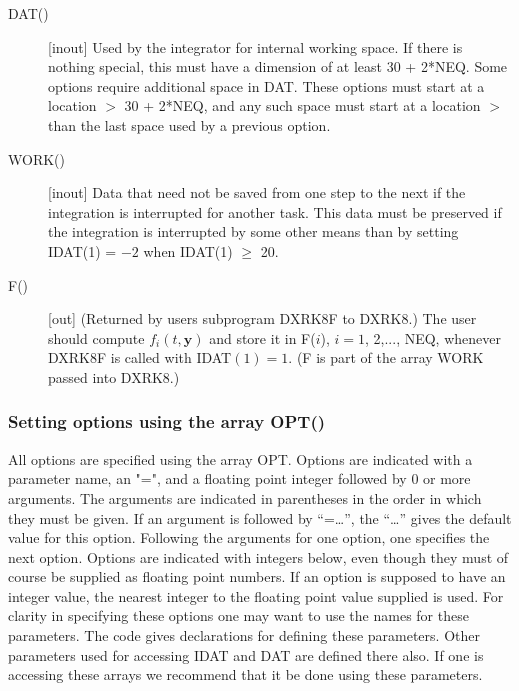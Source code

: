 \documentclass[twoside]{MATH77}
\begin{document}
\begin{description}
\item[DAT()] [inout] Used by the integrator for internal working space.
If there is nothing special, this must have a dimension of at least
30 + 2*NEQ.  Some options require additional space in DAT.  These
options must start at a location $>$ 30 + 2*NEQ, and any such space
must start at a location $>$ than the last space used by a previous
option. 

\item[WORK()] [inout] Data that need not be saved from one step to the
next if the integration is interrupted for another task.  This data must be
preserved if the integration is interrupted by some other means than by
setting IDAT(1) = $-2$ when IDAT(1) $\geq$ 20.

\item[F()]  [out] (Returned by users subprogram DXRK8F to DXRK8.)
The user should compute $f_i(t,{\mathbf y}) $ and store it in F($i$),
$i=1$, 2,..., NEQ, whenever DXRK8F is called with IDAT$(1)=1$.  (F is part
of the array WORK passed into DXRK8.)

\end{description}

\subsubsection{Setting options using the array OPT()\label{OPT}}

All options are specified using the array OPT.  Options are indicated with
a parameter name, an "=", and a floating point integer followed by 0 or
more arguments.  The arguments are indicated in parentheses in the order
in which they must be given.  If an argument is followed by ``=\ldots'',
the ``\ldots'' gives the default value for this option.  Following the
arguments for one option, one specifies the next option.  Options are
indicated with integers below, even though they must of course be supplied
as floating point numbers.  If an option is supposed to have an integer
value, the nearest integer to the floating point value supplied is used.
For clarity in specifying these options one may want to use the names for
these parameters.  The code gives declarations for defining these
parameters.  Other parameters used for accessing IDAT and DAT are defined
there also.  If one is accessing these arrays we recommend that it be done
using these parameters.
\end{document}
